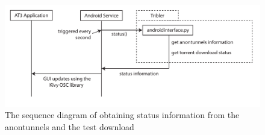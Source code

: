 \begin{figure}[!t]
	\centering
	\includegraphics[width=\textwidth]{graphics/sequence-info.pdf}
	\caption{The sequence diagram of obtaining status information from the anontunnels and the test download}
	\label{fig:sequenceinfo}
\end{figure}



